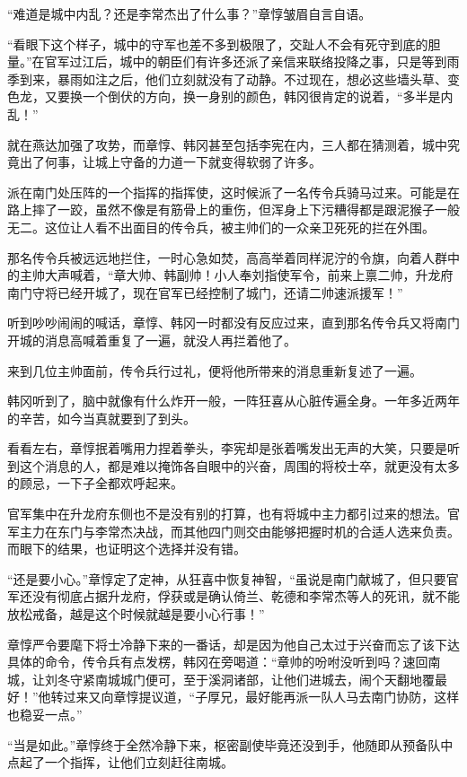 “难道是城中内乱？还是李常杰出了什么事？”章惇皱眉自言自语。

“看眼下这个样子，城中的守军也差不多到极限了，交趾人不会有死守到底的胆量。”在官军过江后，城中的朝臣们有许多还派了亲信来联络投降之事，只是等到雨季到来，暴雨如注之后，他们立刻就没有了动静。不过现在，想必这些墙头草、变色龙，又要换一个倒伏的方向，换一身别的颜色，韩冈很肯定的说着，“多半是内乱！”

就在燕达加强了攻势，而章惇、韩冈甚至包括李宪在内，三人都在猜测着，城中究竟出了何事，让城上守备的力道一下就变得软弱了许多。

派在南门处压阵的一个指挥的指挥使，这时候派了一名传令兵骑马过来。可能是在路上摔了一跤，虽然不像是有筋骨上的重伤，但浑身上下污糟得都是跟泥猴子一般无二。这位让人看不出面目的传令兵，被主帅们的一众亲卫死死的拦在外围。

那名传令兵被远远地拦住，一时心急如焚，高高举着同样泥泞的令旗，向着人群中的主帅大声喊着，“章大帅、韩副帅！小人奉刘指使军令，前来上禀二帅，升龙府南门守将已经开城了，现在官军已经控制了城门，还请二帅速派援军！”

听到吵吵闹闹的喊话，章惇、韩冈一时都没有反应过来，直到那名传令兵又将南门开城的消息高喊着重复了一遍，就没人再拦着他了。

来到几位主帅面前，传令兵行过礼，便将他所带来的消息重新复述了一遍。

韩冈听到了，脑中就像有什么炸开一般，一阵狂喜从心脏传遍全身。一年多近两年的辛苦，如今当真就要到了到头。

看看左右，章惇抿着嘴用力捏着拳头，李宪却是张着嘴发出无声的大笑，只要是听到这个消息的人，都是难以掩饰各自眼中的兴奋，周围的将校士卒，就更没有太多的顾忌，一下子全都欢呼起来。

官军集中在升龙府东侧也不是没有别的打算，也有将城中主力都引过来的想法。官军主力在东门与李常杰决战，而其他四门则交由能够把握时机的合适人选来负责。而眼下的结果，也证明这个选择并没有错。

“还是要小心。”章惇定了定神，从狂喜中恢复神智，“虽说是南门献城了，但只要官军还没有彻底占据升龙府，俘获或是确认倚兰、乾德和李常杰等人的死讯，就不能放松戒备，越是这个时候就越是要小心行事！”

章惇严令要麾下将士冷静下来的一番话，却是因为他自己太过于兴奋而忘了该下达具体的命令，传令兵有点发楞，韩冈在旁喝道：“章帅的吩咐没听到吗？速回南城，让刘冬守紧南城城门便可，至于溪洞诸部，让他们进城去，闹个天翻地覆最好！”他转过来又向章惇提议道，“子厚兄，最好能再派一队人马去南门协防，这样也稳妥一点。”

“当是如此。”章惇终于全然冷静下来，枢密副使毕竟还没到手，他随即从预备队中点起了一个指挥，让他们立刻赶往南城。

